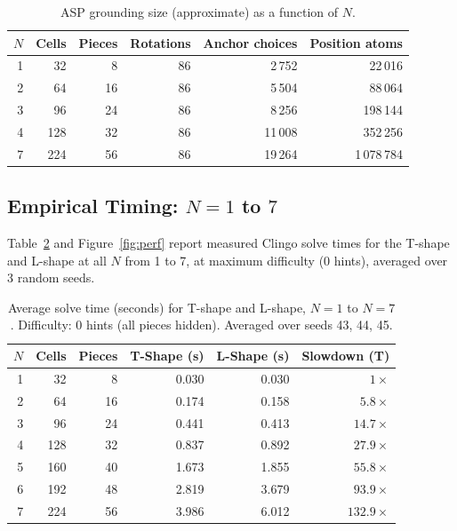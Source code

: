 \documentclass[12pt,a4paper]{article}
\begin{document}
\begin{table}[H]
\centering
\caption{ASP grounding size (approximate) as a function of $N$.}
\label{tab:ground}
\renewcommand{\arraystretch}{1.2}
\begin{tabular}{@{}rrrrrr@{}}
  \toprule
  $N$ & Cells & Pieces & Rotations & Anchor choices & Position atoms\\
  \midrule
  1 &  32 &  8 & 86 &   2\,752 &   22\,016 \\
  2 &  64 & 16 & 86 &   5\,504 &   88\,064 \\
  3 &  96 & 24 & 86 &   8\,256 & 198\,144 \\
  4 & 128 & 32 & 86 &  11\,008 & 352\,256 \\
  7 & 224 & 56 & 86 &  19\,264 & 1\,078\,784 \\
  \bottomrule
\end{tabular}
\end{table}

\subsection{Empirical Timing: $N = 1$ to $7$}

Table~\ref{tab:timing} and Figure~\ref{fig:perf} report measured Clingo
solve times for the T-shape and L-shape at all $N$ from 1 to 7, at maximum
difficulty (0 hints), averaged over 3 random seeds.

\begin{table}[H]
\centering
\caption{Average solve time (seconds) for T-shape and L-shape, $N=1$ to $N=7$.
         Difficulty: 0 hints (all pieces hidden). Averaged over seeds 43, 44, 45.}
\label{tab:timing}
\renewcommand{\arraystretch}{1.25}
\begin{tabular}{@{}rrrrrr@{}}
  \toprule
  $N$ & \textbf{Cells} & \textbf{Pieces} & \textbf{T-Shape (s)} & \textbf{L-Shape (s)} & \textbf{Slowdown (T)} \\
  \midrule
  1 &  32 &  8 & 0.030 & 0.030 & $1\times$ \\
  2 &  64 & 16 & 0.174 & 0.158 & $5.8\times$ \\
  3 &  96 & 24 & 0.441 & 0.413 & $14.7\times$ \\
  4 & 128 & 32 & 0.837 & 0.892 & $27.9\times$ \\
  5 & 160 & 40 & 1.673 & 1.855 & $55.8\times$ \\
  6 & 192 & 48 & 2.819 & 3.679 & $93.9\times$ \\
  7 & 224 & 56 & 3.986 & 6.012 & $132.9\times$ \\
  \bottomrule
\end{tabular}
\end{table}
\end{document}
